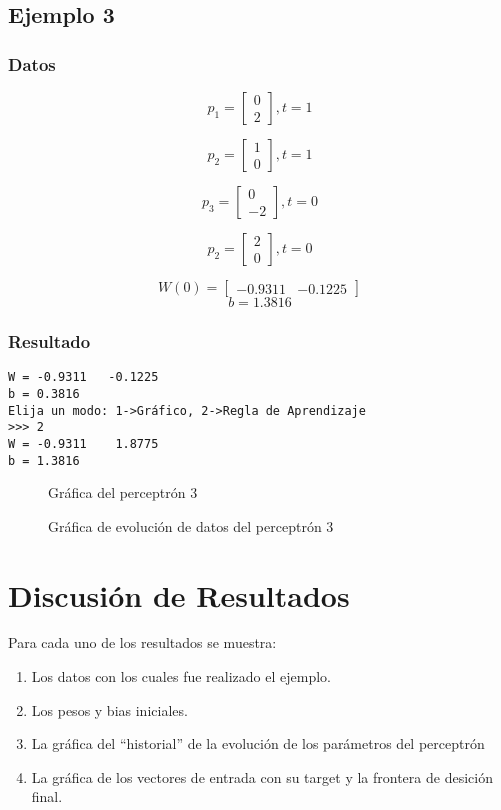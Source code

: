 \documentclass{article}
\begin{document}
\subsection{Ejemplo 3}
\subsubsection{Datos}
\[p_1=
\begin{bmatrix}
0\\
2
\end{bmatrix}
, t=1
\]

\[p_2=
\begin{bmatrix}
1\\
0
\end{bmatrix}
, t=1
\]

\[p_3=
\begin{bmatrix}
0\\
-2
\end{bmatrix}
, t=0
\]

\[p_2=
\begin{bmatrix}
2\\
0
\end{bmatrix}
, t=0
\]

\[W(0)= 
\begin{bmatrix}
-0.9311 &  -0.1225
\end{bmatrix}
\]
$$ b= 1.3816 $$
\subsubsection{Resultado}
\begin{lstlisting}
W = -0.9311   -0.1225
b = 0.3816
Elija un modo: 1->Gráfico, 2->Regla de Aprendizaje
>>> 2
W = -0.9311    1.8775
b = 1.3816
\end{lstlisting}
\begin{figure}[htpb]
	\centering
	
	\caption{Gráfica del perceptrón 3}
\end{figure}
\begin{figure}[htpb]
	\centering
	
	\caption{Gráfica de evolución de datos del perceptrón 3}
\end{figure}
\newpage
\section{Discusión de Resultados}
Para cada uno de los resultados se muestra:
\begin{enumerate}
	\item Los datos con los cuales fue realizado el ejemplo.
	\item Los pesos y bias iniciales.
	\item La gráfica del ``historial'' de la evolución de los parámetros del perceptrón
	\item La gráfica de los vectores de entrada con su target y la frontera de desición final.
\end{enumerate}
\end{document}

